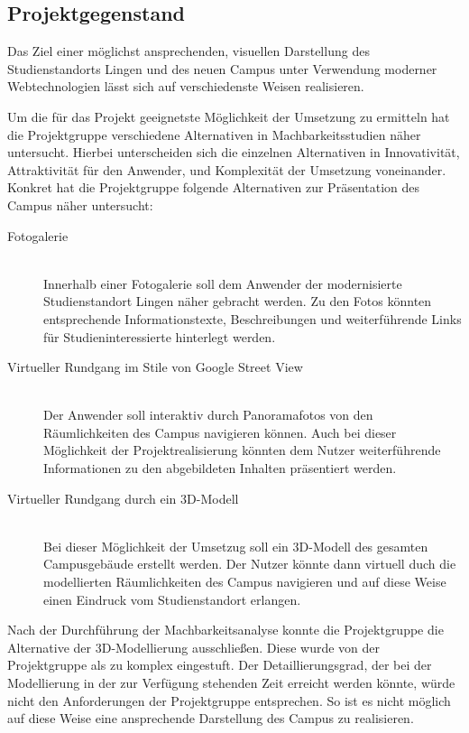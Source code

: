 \subsection{Projektgegenstand}
\label{sec:Projektgegenstand}

Das Ziel einer möglichst ansprechenden, visuellen Darstellung des
Studienstandorts Lingen und des neuen Campus unter Verwendung moderner
Webtechnologien lässt sich auf verschiedenste Weisen realisieren. 

Um die für das Projekt geeignetste Möglichkeit der Umsetzung zu ermitteln hat
die Projektgruppe verschiedene Alternativen in Machbarkeitsstudien näher
untersucht. Hierbei unterscheiden sich die einzelnen Alternativen in
Innovativität, Attraktivität für den Anwender, und Komplexität der Umsetzung
voneinander. Konkret hat die Projektgruppe folgende Alternativen zur
Präsentation des Campus näher untersucht:

\begin{description}
\item[Fotogalerie] \hfill \\
Innerhalb einer Fotogalerie soll dem Anwender der modernisierte Studienstandort
Lingen näher gebracht werden. Zu den Fotos könnten entsprechende
Informationstexte, Beschreibungen und weiterführende Links für
Studieninteressierte hinterlegt werden.
\item[Virtueller Rundgang im Stile von Google Street View] \hfill \\
Der Anwender soll interaktiv durch Panoramafotos von den Räumlichkeiten des
Campus navigieren können. Auch bei dieser Möglichkeit der Projektrealisierung
könnten dem Nutzer weiterführende Informationen zu den abgebildeten Inhalten
präsentiert werden.
\item[Virtueller Rundgang durch ein 3D-Modell] \hfill \\
Bei dieser Möglichkeit der Umsetzug soll ein 3D-Modell des gesamten
Campusgebäude erstellt werden. Der Nutzer könnte dann virtuell duch die
modellierten Räumlichkeiten des Campus navigieren und auf diese Weise einen
Eindruck vom Studienstandort erlangen.
\end{description}

Nach der Durchführung der Machbarkeitsanalyse konnte die Projektgruppe die
Alternative der 3D-Modellierung ausschließen. Diese wurde von der Projektgruppe
als zu komplex eingestuft. Der Detaillierungsgrad, der bei der Modellierung in
der zur Verfügung stehenden Zeit erreicht werden könnte, würde nicht den
Anforderungen der Projektgruppe entsprechen. So ist es nicht möglich auf diese
Weise eine ansprechende Darstellung des Campus zu realisieren. 

